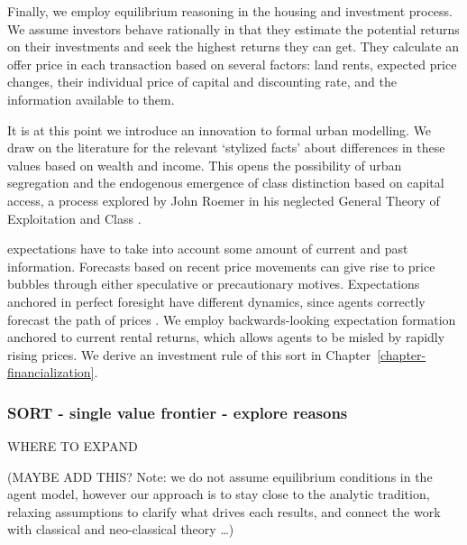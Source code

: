 {Finally, we employ \gls{equilibrium reasoning} in the housing and investment process. We assume investors behave rationally in that they estimate the potential returns on their investments and seek the highest returns they can get. They calculate an offer price in each transaction based on several factors: land rents, expected price changes, their individual price of capital and discounting rate, and the information available to them.

It is at this point we introduce an innovation to formal urban modelling. We draw on the literature for the relevant `\gls{stylized facts}' about differences in these values based on wealth and income. This opens the possibility of urban segregation and the endogenous emergence of \gls{class} distinction based on capital access, a process explored by John Roemer in his neglected General Theory of Exploitation and Class \cite{roemerGeneralTheoryExploitation1982}.  

\Glspl{expectation} have to take into account some amount of current and past information. Forecasts based on recent price movements can give rise to \gls{price bubble}s through either speculative or precautionary motives. Expectations anchored in \gls{perfect foresight} have different dynamics, since agents correctly forecast the path of prices \cite{muthRationalExpectationsTheory1961}. We employ backwards-looking expectation formation anchored 
to current rental returns, which allows agents to be misled by rapidly rising prices. We derive an investment rule of this sort in Chapter~\ref{chapter-financialization}. 

\subsubsection{SORT - single value frontier - explore reasons}
WHERE TO EXPAND%

(MAYBE ADD THIS? Note: we do not assume equilibrium conditions in the agent model, however our approach is to stay close to the analytic tradition, relaxing assumptions to clarify what drives each results, and connect the work with classical and neo-classical theory \dots)

}
